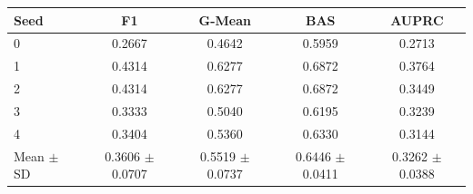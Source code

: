 \begin{tabular}{lcccc}
\toprule
Seed & F1 & G-Mean & BAS & AUPRC \\
\midrule
0 & 0.2667 & 0.4642 & 0.5959 & 0.2713 \\
1 & 0.4314 & 0.6277 & 0.6872 & 0.3764 \\
2 & 0.4314 & 0.6277 & 0.6872 & 0.3449 \\
3 & 0.3333 & 0.5040 & 0.6195 & 0.3239 \\
4 & 0.3404 & 0.5360 & 0.6330 & 0.3144 \\
\midrule
Mean $\pm$ SD & 0.3606 $\pm$ 0.0707 & 0.5519 $\pm$ 0.0737 & 0.6446 $\pm$ 0.0411 & 0.3262 $\pm$ 0.0388 \\
\bottomrule
\end{tabular}
